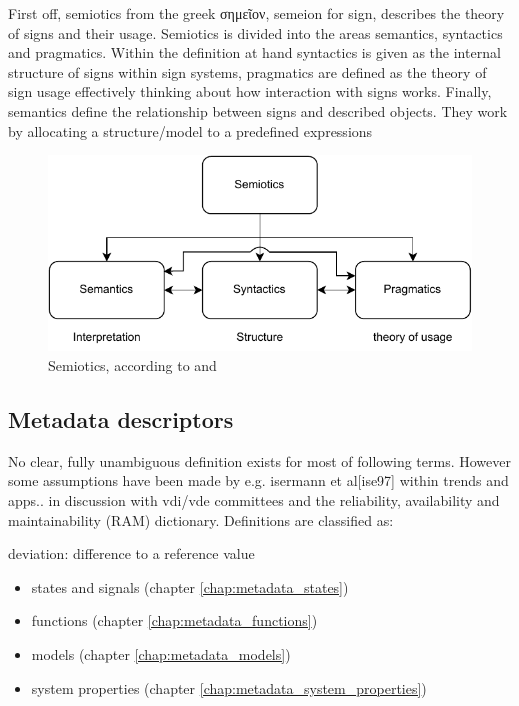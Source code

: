 First off, semiotics from the greek σημεῖον, semeion for sign, describes the theory of signs and their usage. Semiotics is divided into the areas semantics, syntactics and pragmatics. Within the definition at hand syntactics is given as the internal structure of signs within sign systems, pragmatics are defined as the theory of sign usage effectively thinking about how interaction with signs works.
Finally, semantics define the relationship between signs and described objects. They work by allocating a structure/model to a predefined expressions

\begin{figure}
    \centering
    \includegraphics[width=.7\textwidth]{03_figures/semiotics.pdf}
    \caption{Semiotics, according to \textcite{kutschera_sprachphilosophie_1975} and \textcite{shoemaker_spreading_1987}}
\end{figure}

\subsection{Metadata descriptors}

No clear, fully unambiguous definition exists for most of following terms. However some assumptions have been made by e.g. isermann et al[ise97] within trends and apps.. in discussion with vdi/vde committees and the reliability, availability and maintainability (RAM) dictionary. Definitions are classified as:

deviation: difference to a reference value


\begin{itemize}
    \bfseries
    \item states and signals (chapter \ref{chap:metadata_states})
    \item functions (chapter \ref{chap:metadata_functions})
    \item models (chapter \ref{chap:metadata_models})
    \item system properties (chapter \ref{chap:metadata_system_properties})
\end{itemize}

